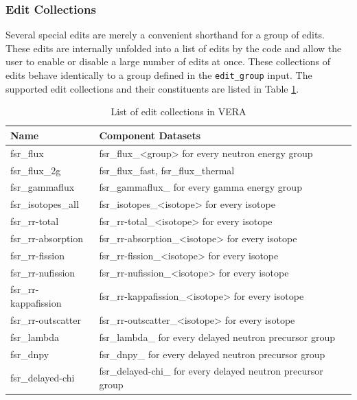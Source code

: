\FloatBarrier

\subsubsection{Edit Collections}\label{sec:edit-collections}

Several special edits are merely a convenient shorthand for a group of edits.  These edits are internally unfolded into a list of edits by the code and allow the user to enable or disable a large number of edits at once.  These collections of edits behave identically to a group defined in the \texttt{edit\_group} input.  The supported edit collections and their constituents are listed in Table \ref{tab:collection-edits}.

\begin{table}[h]
    \centering
    \caption{List of edit collections in VERA}
    \label{tab:collection-edits}
    \begin{tabular}{|l|p{}|}\hline
    {\bf Name} & {\bf Component Datasets} \\\hline
    fsr\_flux & fsr\_flux\_<group> for every neutron energy group \\\hline
    fsr\_flux\_2g & fsr\_flux\_fast, fsr\_flux\_thermal \\\hline
    fsr\_gammaflux & fsr\_gammaflux\_<gamma group> for every gamma energy group \\\hline
    fsr\_isotopes\_all & fsr\_isotopes\_<isotope> for every isotope \\\hline
    fsr\_rr-total & fsr\_rr-total\_<isotope> for every isotope \\\hline
    fsr\_rr-absorption & fsr\_rr-absorption\_<isotope> for every isotope \\\hline
    fsr\_rr-fission & fsr\_rr-fission\_<isotope> for every isotope \\\hline
    fsr\_rr-nufission & fsr\_rr-nufission\_<isotope> for every isotope \\\hline
    fsr\_rr-kappafission & fsr\_rr-kappafission\_<isotope> for every isotope \\\hline
    fsr\_rr-outscatter & fsr\_rr-outscatter\_<isotope> for every isotope \\\hline
    fsr\_lambda & fsr\_lambda\_<delayed group> for every delayed neutron precursor group \\\hline
    fsr\_dnpy & fsr\_dnpy\_<delayed group> for every delayed neutron precursor group \\\hline
    fsr\_delayed-chi & fsr\_delayed-chi\_<delayed group> for every delayed neutron precursor group \\\hline

\end{tabular}
\end{table}

